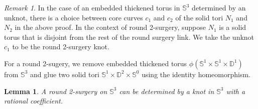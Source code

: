 \documentclass{amsart}
\theoremstyle{plain}
\newtheorem{lem}{Lemma}
\theoremstyle{remark}
\newtheorem{rem}{Remark}
\theoremstyle{definition}
\newcommand{\s}{\mathbb{S}}
\newcommand{\D}{\mathbb{D}}
\begin{document}
\begin{rem}
In the case of an embedded thickened torus in $\s^3$ determined by an unknot, there is a choice between core curves $c_1$ and $c_2$ of the solid tori $N_1$ and $N_2$ in the above proof. 
In the context of round 2-surgery, suppose $N_1$ is a solid torus that is disjoint from the rest of the round surgery link. We take the unknot $c_1$ to be the round 2-surgery knot. 
\end{rem}

For a round 2-sugery, we remove embedded thickened torus $\phi(\s^1 \times \s^1 \times \D^1)$ from $\s^3$ and glue two solid tori $\s^1 \times \D^2 \times \s^0$ using the identity homeomorphism. 

\begin{lem}\label{Lem:R2Diagram}
A round 2-surgery on $\mathbb{S}^3$ can be determined by a knot in $\s^3$ with a rational coefficient. 
\end{lem}
\end{document}
